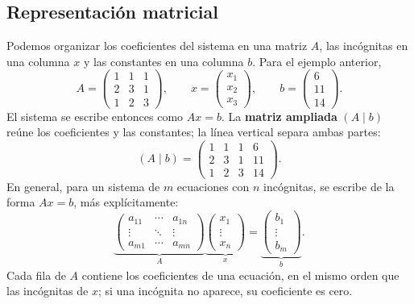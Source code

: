 \documentclass[compacto,10pt]{pubciencias-notas}
\begin{document}
\subsection{Representación matricial}
Podemos organizar los coeficientes del sistema en una matriz $A$, las
incógnitas en una columna $x$ y las constantes en una columna $b$.
Para el ejemplo anterior,
\[
A=\begin{pmatrix}1&1&1\\2&3&1\\1&2&3\end{pmatrix},
\qquad x=\begin{pmatrix}x_1\\x_2\\x_3\end{pmatrix},
\qquad b=\begin{pmatrix}6\\11\\14\end{pmatrix}.
\]
El sistema se escribe entonces como $Ax=b$.
La \textbf{matriz ampliada} $(A\mid b)$ reúne los coeficientes y las constantes;
la línea vertical separa ambas partes:
\[
(A\mid b)=\left(\begin{array}{ccc|c}
1&1&1&6\\2&3&1&11\\1&2&3&14
\end{array}\right).
\]
En general, para un sistema de $m$ ecuaciones con $n$ incógnitas, se escribe de la forma $Ax=b$, más explícitamente:
\[
\underbrace{\begin{pmatrix}
a_{11}&\cdots&a_{1n}\\
\vdots&\ddots&\vdots\\
a_{m1}&\cdots&a_{mn}
\end{pmatrix}}_{A}
\underbrace{\begin{pmatrix}x_1\\\vdots\\x_n\end{pmatrix}}_{x}
=\underbrace{\begin{pmatrix}b_1\\\vdots\\b_m\end{pmatrix}}_{b}.
\]
Cada fila de $A$ contiene los coeficientes de una ecuación, en el mismo
orden que las incógnitas de $x$; si una incógnita no aparece, su coeficiente es cero.
\end{document}
